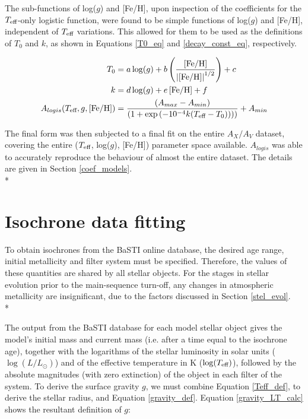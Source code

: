 \documentclass[12pt, a4paper]{report}
\begin{document}
The sub-functions of log($g$) and [Fe/H], upon inspection of the coefficients for the $T_{\textnormal{eff}}$-only logistic function, were found to be simple functions of log($g$) and [Fe/H], independent of $T_{\textnormal{eff}}$ variations. This allowed for them to be used as the definitions of $T_{0}$ and $k$, as shown in Equations \ref{T0_eq} and \ref{decay_const_eq}, respectively.

\begin{align}
T_{\textnormal{0}} &= a\log(g) + b\left(\frac{\left[\textnormal{Fe/H}\right]}{\left|\left[\textnormal{Fe/H}\right]\right|^{1/2}}\right) + c \label{T0_eq}\\
k &= d\log(g) + e\left[\textnormal{Fe/H}\right] + f \label{decay_const_eq}\\
A_{logis}(T_{\textnormal{eff}},g,\left[\textnormal{Fe/H}\right]) &= \frac{(A_{max}-A_{min})}{( 1 + \exp{(-10^{-4} k(T_{\textnormal{eff}}-T_{\textnormal{0}})) ) )}} + A_{min} \label{A_logis_UV}
\end{align}

The final form was then subjected to a final fit on the entire $A_{X}/A_{V}$ dataset, covering the entire ($T_{\textnormal{eff}}$,  log($g$), [Fe/H]) parameter space available. $A_{logis}$ was able to accurately reproduce the behaviour of almost the entire dataset. The details are given in Section \ref{coef_models}.\\*

\section{Isochrone data fitting}
To obtain isochrones from the BaSTI online database, the desired age range, initial metallicity and filter system must be specified. Therefore, the values of these quantities are shared by all stellar objects. For the stages in stellar evolution prior to the main-sequence turn-off, any changes in atmospheric metallicity are insignificant, due to the factors discussed in Section \ref{stel_evol}.\\*

The output from the BaSTI database for each model stellar object gives the model's initial mass and current mass (i.e. after a time equal to the isochrone age), together with the logarithms of the stellar luminosity in solar units ($\log(L/L_{\odot})$) and of the effective temperature in K ($\log(T_{\textnormal{eff}})$), followed by the absolute magnitudes (with zero extinction) of the object in each filter of the system. To derive the surface gravity $g$, we must combine Equation \ref{Teff_def}, to derive the stellar radius, and Equation \ref{gravity_def}. Equation \ref{gravity_LT_calc} shows the resultant definition of $g$:
\end{document}
